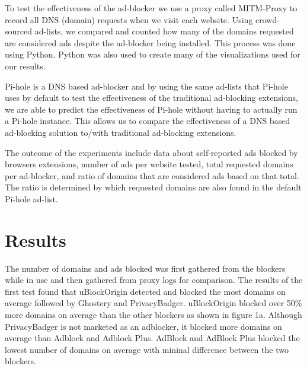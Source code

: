 \documentclass[sigsmall]{acmart}
\begin{document}
To test the effectiveness of the ad-blocker we use a proxy called MITM-Proxy to record all DNS (domain) requests when we visit each website. Using crowd-sourced ad-lists, we compared and counted how many of the domains requested are considered ads despite the ad-blocker being installed. This process was done using Python. Python was also used to create many of the visualizations used for our results.

Pi-hole is a DNS based ad-blocker and by using the same ad-lists that Pi-hole uses by default to test the effectiveness of the traditional ad-blocking extensions, we are able to predict the effectiveness of Pi-hole without having to actually run a Pi-hole instance. This allows us to compare the effectiveness of a DNS based ad-blocking solution to/with traditional ad-blocking extensions.

The outcome of the experiments include data about self-reported ads blocked by browsers extensions, number of ads per website tested, total requested domains per ad-blocker, and ratio of domains that are considered ads based on that total. The ratio is determined by which requested domains are also found in the default Pi-hole ad-list.

\section*{Results}
The number of domains and ads blocked was first gathered from the blockers while in use and then gathered from proxy logs for comparison. The results of the first test found that uBlockOrigin detected and blocked the most domains on average followed by Ghostery and PrivacyBadger. uBlockOrigin blocked over 50\% more domains on average than the other blockers as shown in figure 1a. Although PrivacyBadger is not marketed as an adblocker, it blocked more domains on average than Adblock and Adblock Plus. 
AdBlock and AdBlock Plus blocked the lowest number of domains on average with mininal difference between the two blockers.  
 
\end{document}
